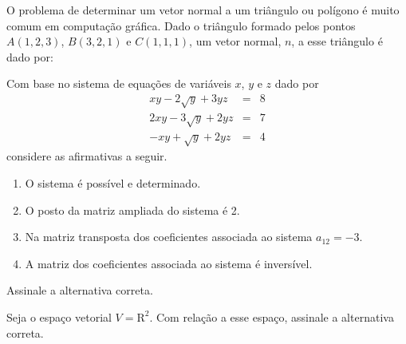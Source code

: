 \documentclass[10pt,a4paper]{article}
\begin{document}
%
{
\def\AMCbeginQuestion#1#2{\par\noindent{\bf (POSCOMP 2011 - Questão 06)}}
\begin{question}{} O problema de determinar um vetor normal a um triângulo ou polígono é muito comum em computação gráfica. Dado o triângulo formado pelos pontos $A(1,2,3)$, $B(3,2,1)$ e $C(1,1,1)$, um vetor normal, $n$, a esse triângulo é dado por:
\begin{choices}
\end{choices}
\end{question}
}
%
{
\def\AMCbeginQuestion#1#2{\par\noindent{\bf (POSCOMP 2012 - Questão 01)}}
\begin{question}{} Com base no sistema de equações de variáveis $x$, $y$ e $z$ dado por
\[
\begin{array}{rcl}
xy-2\sqrt{y}+3yz&=&8\\
2xy-3\sqrt{y}+2yz&=&7\\
-xy+\sqrt{y}+2yz&=&4
\end{array}
\]
considere as afirmativas a seguir.
\begin{enumerate}
\item[I.] O sistema é possível e determinado.
\item[II.] O posto da matriz ampliada do sistema é 2.
\item[III.] Na matriz transposta dos coeficientes associada ao sistema $a_{12}=-3$.
\item[IV.] A matriz dos coeficientes associada ao sistema é inversível.
\end{enumerate}
Assinale a alternativa correta.
\begin{choices}
\end{choices}
\end{question}
}
%
{
\def\AMCbeginQuestion#1#2{\par\noindent{\bf (POSCOMP 2012 - Questão 02)}}
\begin{question}{} Seja o espaço vetorial $V=\mathrm{R}^{2}$. Com relação a esse espaço, assinale a alternativa correta.
\begin{choices}
\end{choices}
\end{question}
}
\end{document}
